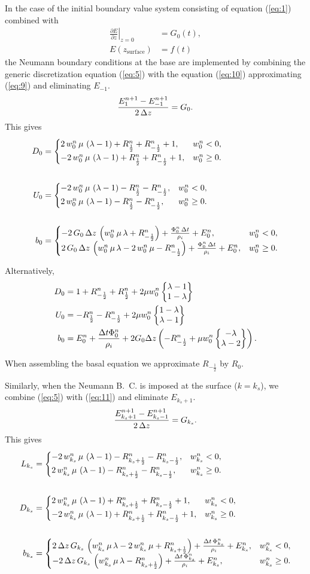 \documentclass{article}
\newcommand{\wcase}[3]{\begin{cases} #1, & w^{n}_{#3} < 0,\\#2, & w^{n}_{#3} \ge 0.\end{cases}}
\newcommand{\wcaseeq}[4]{#1 &= \wcase{#2}{#3}{#4}}
\begin{document}
In the case of the initial boundary value system consisting of
equation (\ref{eq:1}) combined with
\begin{align}
  \label{eq:9}
  \left.\frac{\partial E}{\partial z}\right|_{z = 0} &= G_{0}(t),\\
  E(z_{\text{surface}}) &= f(t)
\end{align}
the Neumann boundary conditions at the base are implemented by
combining the generic discretization equation (\ref{eq:5}) with the
equation (\ref{eq:10}) approximating (\ref{eq:9}) and eliminating
$E_{-1}$.
\begin{equation}
  \label{eq:10}
  \frac{E^{n+1}_{1}-E^{n+1}_{-1}}{2\,\Delta z}=G_{0}.
\end{equation}
This gives
\begin{align}
  \wcaseeq{D_{0}}{\Dmb}{\Dpb}{0}\\
  \notag\\
  \wcaseeq{U_{0}}{\Umb}{\Upb}{0}\\
  \notag\\
  \wcaseeq{b_{0}}{\Bmb}{\Bpb}{0}
\end{align}

\renewcommand{\Rp}{R^{n}_{\frac{1}{2}}}
\renewcommand{\Rm}{R^{n}_{-\frac{1}{2}}}
\renewcommand{\W}{w^{n}_{0}}

\newcommand{\rhs}[1]{E^{n}_{#1} + \frac{\Delta t \Phi^{n}_{#1}}{\rho_{i}}}

Alternatively,
\begin{align}
  D_{0} &= 1 + \Rm + \Rp + 2\mu\W \wstack{\lambda - 1}{1 - \lambda}\\
  U_{0} &= -\Rp -\Rm + 2\mu\W \wstack{1 - \lambda}{\lambda - 1}\\
  b_{0} &= \rhs{0} + 2G_{0}\Delta z \left( -\Rm + \mu\W\wstack{-\lambda}{\lambda - 2} \right).
\end{align}

When assembling the basal equation we approximate $R_{-\frac{1}{2}}$ by $R_{0}$.

\newcommand{\ks}{k_{s}}

Similarly, when the Neumann B.~C. is imposed at the surface ($k =
\ks$), we combine (\ref{eq:5}) with (\ref{eq:11}) and eliminate $E_{\ks+1}$.
\begin{equation}
  \label{eq:11}
  \frac{E^{n+1}_{k_{s}+1}-E^{n+1}_{k_{s}-1}}{2\,\Delta z}=G_{k_{s}}.
\end{equation}
This gives
\begin{align}
  \wcaseeq{L_{\ks}}{\Lms}{\Lps}{\ks}\\
  \notag\\
  \wcaseeq{D_{\ks}}{\Dms}{\Dps}{\ks}\\
  \notag\\
  \wcaseeq{b_{\ks}}{\Bms}{\Bps}{\ks}
\end{align}
\end{document}
